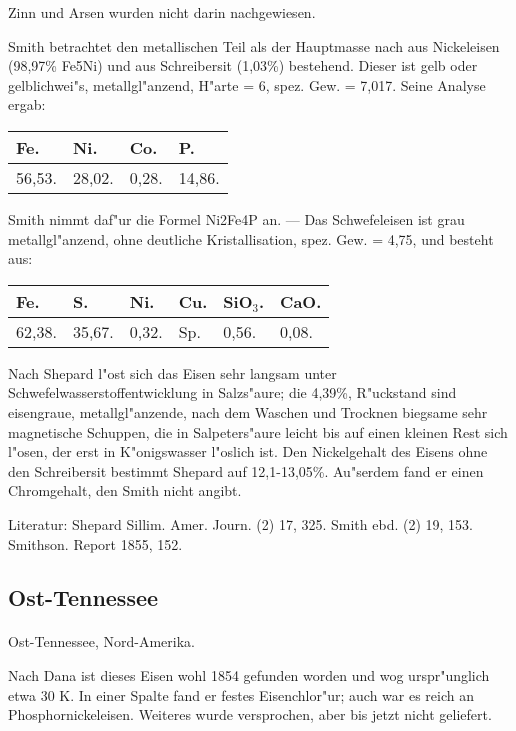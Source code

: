 \documentclass[a4paper, 11pt, oneside]{article}
\begin{document}
Zinn und Arsen wurden nicht darin nachgewiesen.

Smith betrachtet den metallischen Teil als der Hauptmasse nach aus Nickeleisen (98,97\% Fe5Ni) und aus Schreibersit (1,03\%) bestehend. Dieser ist gelb oder gelblichwei"s, metallgl"anzend, H"arte = 6, spez. Gew. = 7,017. Seine Analyse ergab:
\begin{table}[H]
    \centering
    \begin{tabular}{l l l l}
        Fe. & Ni. & Co. & P. \\ \hline
        56,53. & 28,02. & 0,28. & 14,86. \\
    \end{tabular}
\end{table}

Smith nimmt daf"ur die Formel Ni2Fe4P an. --- Das Schwefeleisen ist grau metallgl"anzend, ohne deutliche Kristallisation, spez. Gew. = 4,75, und besteht aus:
\begin{table}[H]
    \centering
    \begin{tabular}{l l l l l l}
        Fe. & S. & Ni. & Cu. & SiO$_{3}$. & CaO. \\ \hline
        62,38. & 35,67. & 0,32. & Sp. & 0,56. & 0,08. \\
    \end{tabular}
\end{table}

Nach Shepard l"ost sich das Eisen sehr langsam unter Schwefelwasserstoffentwicklung in Salzs"aure; die 4,39\%, R"uckstand sind eisengraue, metallgl"anzende, nach dem Waschen und Trocknen biegsame sehr magnetische Schuppen, die in Salpeters"aure leicht bis auf einen kleinen Rest sich l"osen, der erst in K"onigswasser l"oslich ist. Den Nickelgehalt des Eisens ohne den Schreibersit bestimmt Shepard auf 12,1-13,05\%. Au"serdem fand er einen Chromgehalt, den Smith nicht angibt.

\footnotesize
Literatur: Shepard Sillim. Amer. Journ. (2) 17, 325. Smith ebd. (2) 19, 153. Smithson. Report 1855, 152.

\subsection{Ost-Tennessee}
\normalsize
\paragraph{}
Ost-Tennessee, Nord-Amerika.

Nach Dana ist dieses Eisen wohl 1854 gefunden worden und wog urspr"unglich etwa 30 K. In einer Spalte fand er festes Eisenchlor"ur; auch war es reich an Phosphornickeleisen. Weiteres wurde versprochen, aber bis jetzt nicht geliefert.
\end{document}
